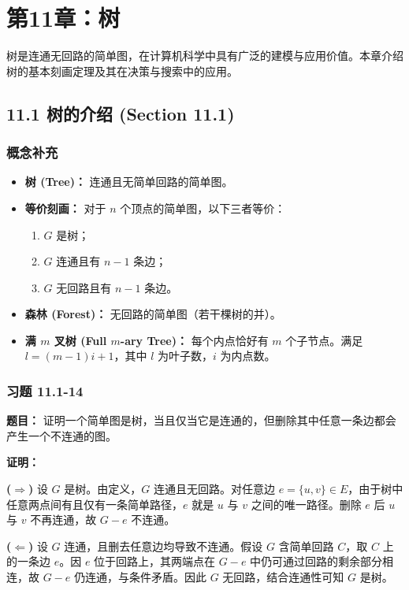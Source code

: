 \documentclass[11pt,UTF8]{article}
\begin{document}
\newpage

\section{第11章：树}

树是连通无回路的简单图，在计算机科学中具有广泛的建模与应用价值。本章介绍树的基本刻画定理及其在决策与搜索中的应用。

\subsection{11.1 树的介绍 (Section 11.1)}

\subsubsection*{概念补充}
\begin{itemize}
    \item \textbf{树 (Tree)：} 连通且无简单回路的简单图。
    \item \textbf{等价刻画：} 对于 $n$ 个顶点的简单图，以下三者等价：
    \begin{enumerate}[(1)]
        \item $G$ 是树；
        \item $G$ 连通且有 $n-1$ 条边；
        \item $G$ 无回路且有 $n-1$ 条边。
    \end{enumerate}
    \item \textbf{森林 (Forest)：} 无回路的简单图（若干棵树的并）。
    \item \textbf{满 $m$ 叉树 (Full $m$-ary Tree)：} 每个内点恰好有 $m$ 个子节点。满足 $l = (m-1)i + 1$，其中 $l$ 为叶子数，$i$ 为内点数。
\end{itemize}

\subsubsection*{习题 11.1-14}
\textbf{题目：} 证明一个简单图是树，当且仅当它是连通的，但删除其中任意一条边都会产生一个不连通的图。

\textbf{证明：}

\textbf{($\Rightarrow$)} 设 $G$ 是树。由定义，$G$ 连通且无回路。对任意边 $e=\{u,v\} \in E$，由于树中任意两点间有且仅有一条简单路径，$e$ 就是 $u$ 与 $v$ 之间的唯一路径。删除 $e$ 后 $u$ 与 $v$ 不再连通，故 $G-e$ 不连通。

\textbf{($\Leftarrow$)} 设 $G$ 连通，且删去任意边均导致不连通。假设 $G$ 含简单回路 $C$，取 $C$ 上的一条边 $e$。因 $e$ 位于回路上，其两端点在 $G-e$ 中仍可通过回路的剩余部分相连，故 $G-e$ 仍连通，与条件矛盾。因此 $G$ 无回路，结合连通性可知 $G$ 是树。
\end{document}
